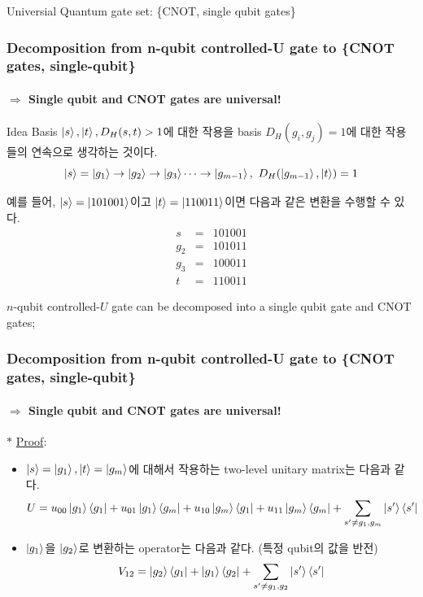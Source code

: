 \documentclass[9pt]{beamer}
\begin{document}
\begin{section}{Universial Quantum gate set: \{CNOT, single qubit gates\}}
\begin{frame}
                
        
        \end{frame}

        \begin{frame}
            \frametitle{Decomposition from n-qubit controlled-U gate to \{CNOT gates, single-qubit\}}
            \framesubtitle{$\Rightarrow$ Single qubit and CNOT gates are universal!}
            \begin{alertblock}{Idea}
                Basis $\ket{s},\ket{t}, D_H(s, t) > 1$에 대한 작용을 basis $D_H(g_i, g_j) = 1$에 대한 작용들의 연속으로 생각하는 것이다.
                $$\ket{s} = \ket{g_1} \rightarrow \ket{g_2} \rightarrow \ket{g_3} \cdots \rightarrow \ket{g_{m-1}},\  D_H(\ket{g_{m-1}},\ket{t}) = 1$$
            \end{alertblock}
            예를 들어, $\ket s = \ket{101001}$이고 $\ket t =\ket{110011}$이면 다음과 같은 변환을 수행할 수 있다.
            $$
            \begin{aligned}
            s & = &101001 \\
            g_2 & = &101011 \\
            g_3 & = &100011 \\
            t & = &110011
            \end{aligned}
            $$
            \begin{theorem}\label{thr:CNOT-single de}
                $n$-qubit controlled-$U$ gate can be decomposed into a single qubit gate and CNOT gates;
            \end{theorem}
            \vspace{0.2cm}
            

        \end{frame}

        \begin{frame}
            \frametitle{Decomposition from n-qubit controlled-U gate to \{CNOT gates, single-qubit\}}
            \framesubtitle{$\Rightarrow$ Single qubit and CNOT gates are universal!}
                $\ast$ \underline{Proof}: 
                \begin{itemize}
                    \item $\ket{s}=\ket{g_1}, \ket{t}=\ket{g_m}$에 대해서 작용하는 two-level unitary matrix는 다음과 같다.
                    $$U = u_{00} \ket{g_1}\bra{g_1} + u_{01}\ket{g_1}\bra{g_m} +u_{10} \ket{g_m}\bra{g_1}+ u_{11} \ket{g_m}\bra{g_m} + \sum_{s'\ne g_1, g_m} \ket{s'} \bra {s'}$$
                    \item $\ket{g_1}$을 $\ket{g_2}$로 변환하는 operator는 다음과 같다. (특정 qubit의 값을 반전)
                    $$V_{12} = \ket{g_2}\bra{g_1} + \ket{g_1}\bra{g_2}+ \sum_{s'\ne g_1, g_2} \ket{s'} \bra {s'}$$
                    

\end{itemize}
\end{frame}
\end{section}
\end{document}
